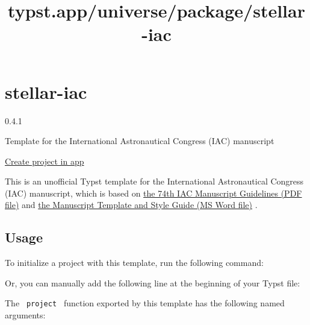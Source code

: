 \title{typst.app/universe/package/stellar-iac}

\label{banner}
\label{template-thumbnail}

\section{stellar-iac}\label{stellar-iac}

{ 0.4.1 }

Template for the International Astronautical Congress (IAC) manuscript

\href{/app?template=stellar-iac&version=0.4.1}{Create project in app}

\label{readme}
This is an unofficial Typst template for the International Astronautical
Congress (IAC) manuscript, which is based on
\href{https://www.iafastro.org/assets/files/IAC\%202023\%20Manuscript\%20Guidelines.pdf}{the
74th IAC Manuscript Guidelines (PDF file)} and
\href{https://www.iafastro.org/assets/files/IAC\%202023_Manuscript-Template.doc}{the
Manuscript Template and Style Guide (MS Word file)} .

\subsection{Usage}\label{usage}

To initialize a project with this template, run the following command:

\begin{Shaded}
\begin{Highlighting}[]
\end{Highlighting}
\end{Shaded}

Or, you can manually add the following line at the beginning of your
Typst file:

\begin{Shaded}
\begin{Highlighting}[]
\end{Highlighting}
\end{Shaded}

The \texttt{\ project\ } function exported by this template has the
following named arguments:

